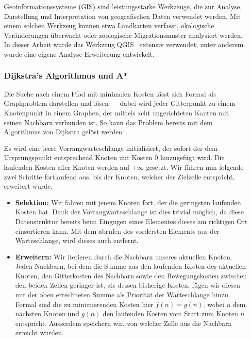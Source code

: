 Geoinformationssysteme (GIS) sind leistungsstarke Werkzeuge, die zur Analyse, Darstellung und Interpretation von geografischen Daten verwendet werden. Mit einem solchen Werkzeug können etwa Landkarten verfasst, ökologische Veränderungen überwacht oder zoologische Migrationsmuster analysiert werden.
In dieser Arbeit wurde das Werkzeug QGIS~\cite{qgis} extensiv verwendet; unter anderem wurde eine eigene Analyse-Erweiterung entwickelt.


\subsubsection{Dijkstra's Algorithmus und A*}

Die Suche nach einem Pfad mit minimalen Kosten lässt sich Formal als Graphproblem darstellen und lösen --- dabei wird jeder Gitterpunkt zu einem Knotenpunkt in einem Graphen, der mittels acht ungerichteten Kanten mit seinen Nachbarn verbunden ist. So kann das Problem bereits mit dem Algorithmus von Dijkstra gelöst werden~\cite{dijkstra1959note}.

Es wird eine leere Vorrangwarteschlange initialisiert, der sofort der dem Ursprungspunkt entsprechend Knoten mit Kosten 0 hinzugefügt wird. Die laufenden Kosten aller Knoten werden auf $+ \infty$ gesetzt. Wir führen nun folgende zwei Schritte fortlaufend aus, bis der Knoten, welcher der Zielzelle entspricht, erweitert wurde.
\begin{itemize}
  \item \textbf{Selektion:} Wir fahren mit jenem Knoten fort, der die geringsten laufenden Kosten hat. Dank der Vorrangwarteschlange ist dies trivial möglich, da diese Datenstruktur bereits beim Eingügen eines Elementes dieses am richtigen Ort einsortieren kann. Mit dem abrufen des vordersten Elements aus der Warteschlange, wird dieses auch entfernt.
  \item \textbf{Erweitern:} Wir iterieren durch die Nachbarn unseres aktuellen Knoten. Jeden Nachbarn, bei dem die Summe aus den laufenden Kosten des aktuellen Knoten, den Gitterkosten des Nachbarn sowie den Bewegungskosten zwischen den beiden Zellen geringer ist, als dessen bisherige Kosten, fügen wir diesen mit der oben errechneten Summe als Priorität der Warteschlange hinzu. Formal sind die zu minimierenden Kosten hier $f(n)=g(n)$, wobei $n$ dem nächsten Knoten und $g(n)$ den laufenden Kosten vom Start zum Knoten $n$ entspricht. Ausserdem speichern wir, von welcher Zelle aus die Nachbarn erreicht wurden.
\end{itemize}

